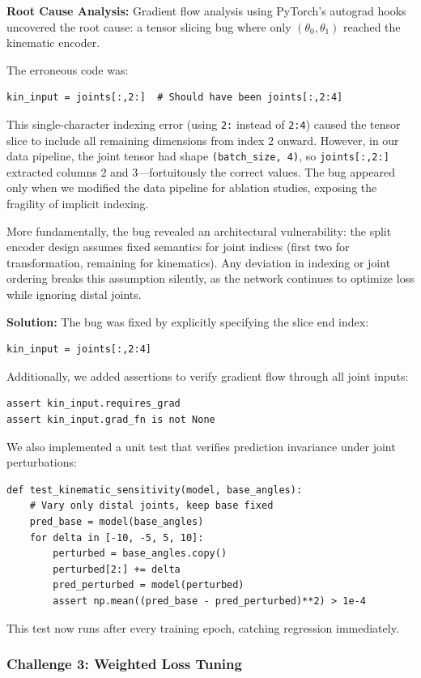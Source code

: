 \documentclass[12pt,a4paper,oneside]{report}
\begin{document}
\textbf{Root Cause Analysis:} Gradient flow analysis using PyTorch's autograd hooks uncovered the root cause: a tensor slicing bug where only $(\theta_0, \theta_1)$ reached the kinematic encoder.

The erroneous code was:
\begin{verbatim}
kin_input = joints[:,2:]  # Should have been joints[:,2:4]
\end{verbatim}
This single-character indexing error (using \texttt{2:} instead of \texttt{2:4}) caused the tensor slice to include all remaining dimensions from index 2 onward. However, in our data pipeline, the joint tensor had shape \texttt{(batch\_size, 4)}, so \texttt{joints[:,2:]} extracted columns 2 and 3---fortuitously the correct values. The bug appeared only when we modified the data pipeline for ablation studies, exposing the fragility of implicit indexing.

More fundamentally, the bug revealed an architectural vulnerability: the split encoder design assumes fixed semantics for joint indices (first two for transformation, remaining for kinematics). Any deviation in indexing or joint ordering breaks this assumption silently, as the network continues to optimize loss while ignoring distal joints.

\textbf{Solution:} The bug was fixed by explicitly specifying the slice end index:
\begin{verbatim}
kin_input = joints[:,2:4]
\end{verbatim}
Additionally, we added assertions to verify gradient flow through all joint inputs:
\begin{verbatim}
assert kin_input.requires_grad
assert kin_input.grad_fn is not None
\end{verbatim}
We also implemented a unit test that verifies prediction invariance under joint perturbations:
\begin{verbatim}
def test_kinematic_sensitivity(model, base_angles):
    # Vary only distal joints, keep base fixed
    pred_base = model(base_angles)
    for delta in [-10, -5, 5, 10]:
        perturbed = base_angles.copy()
        perturbed[2:] += delta
        pred_perturbed = model(perturbed)
        assert np.mean((pred_base - pred_perturbed)**2) > 1e-4
\end{verbatim}
This test now runs after every training epoch, catching regression immediately.

\subsubsection{Challenge 3: Weighted Loss Tuning}
\end{document}
